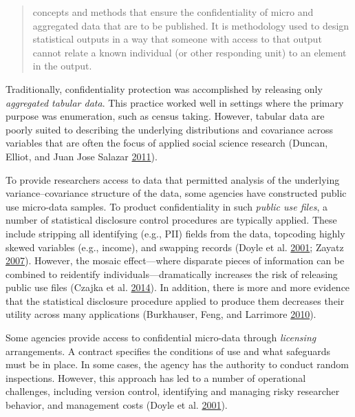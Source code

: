 \documentclass[]{krantz}
\begin{document}
\begin{quote}
concepts and methods that ensure the confidentiality of micro and
aggregated data that are to be published. It is methodology used to
design statistical outputs in a way that someone with access to that
output cannot relate a known individual (or other responding unit) to an
element in the output.
\end{quote}

Traditionally, confidentiality protection was accomplished by releasing
only \emph{aggregated tabular data}. This practice worked well in
settings where the primary purpose was enumeration, such as census
taking. However, tabular data are poorly suited to describing the
underlying distributions and covariance across variables that are often
the focus of applied social science research (Duncan, Elliot, and Juan
Jose Salazar \protect\hyperlink{ref-duncanstatistical}{2011}).

To provide researchers access to data that permitted analysis of the
underlying variance--covariance structure of the data, some agencies
have constructed public use micro-data samples. To product
confidentiality in such \emph{public use files}, a number of statistical
disclosure control procedures are typically applied. These include
stripping all identifying (e.g., PII) fields from the data, topcoding
highly skewed variables (e.g., income), and swapping records (Doyle et
al. \protect\hyperlink{ref-doyle2001confidentiality}{2001}; Zayatz
\protect\hyperlink{ref-zayatz2007disclosure}{2007}). However, the mosaic
effect---where disparate pieces of information can be combined to
reidentify individuals---dramatically increases the risk of releasing
public use files (Czajka et al.
\protect\hyperlink{ref-czajka2014minimizing}{2014}). In addition, there
is more and more evidence that the statistical disclosure procedure
applied to produce them decreases their utility across many applications
(Burkhauser, Feng, and Larrimore
\protect\hyperlink{ref-burkhauser2010improving}{2010}).

Some agencies provide access to confidential micro-data through
\emph{licensing} arrangements. A contract specifies the conditions of
use and what safeguards must be in place. In some cases, the agency has
the authority to conduct random inspections. However, this approach has
led to a number of operational challenges, including version control,
identifying and managing risky researcher behavior, and management costs
(Doyle et al. \protect\hyperlink{ref-doyle2001confidentiality}{2001}).
\end{document}
